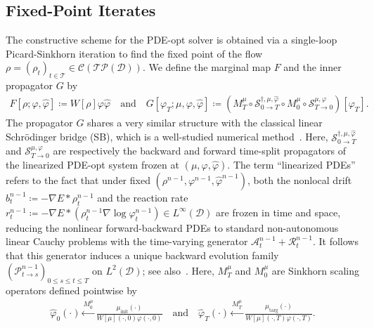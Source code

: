 \documentclass[10pt,a4paper]{article}
\begin{document}
\subsection{Fixed-Point Iterates}
The constructive scheme for the PDE-opt solver is obtained via a single-loop Picard-Sinkhorn iteration to find the fixed point of the flow $\rho = (\rho_t)_{t\in\mathcal{T}} \in \mathcal{C}(\mathcal{T}\mathscr{P}(\mathcal{D}))$. We define the marginal map $F$ and the inner propagator $G$ by
\begin{equation}
\begin{aligned}
F[\rho; \varphi, \hat{\varphi}] \coloneq W[\rho]\varphi\hat{\varphi} \quad \text{and} \quad G[\varphi_T; \mu, \varphi, \hat{\varphi}] \coloneq \left( M_T^{\mu} \circ \mathcal{S}_{0\to T}^{\dagger, \mu, \hat{\varphi}} \circ M_0^{\mu} \circ \mathcal{S}_{T\to 0}^{\mu, \varphi} \right)[\varphi_T].
\end{aligned}
\end{equation}%
The propagator $G$ shares a very similar structure with the classical linear Schrödinger bridge (SB), which is a well-studied numerical method~\cite{Chen2021SinkhornReview, leonard2012from}. Here, $\mathcal{S}_{0\to T}^{\dagger, \mu, \hat{\varphi}}$ and $\mathcal{S}_{T\to 0}^{\mu, \varphi}$ are respectively the backward and forward time-split propagators of the linearized PDE-opt system frozen at $(\mu, \varphi, \hat{\varphi})$. The term ``linearized PDEs'' refers to the fact that under fixed $(\rho^{n-1}, \varphi^{n-1}, \hat{\varphi}^{n-1})$, both the nonlocal drift $b_t^{n-1} \coloneq -\nabla E \ast \rho_t^{n-1}$ and the reaction rate $r_t^{n-1} \coloneq -\nabla E \ast (\rho_t^{n-1} \nabla \log \varphi_t^{n-1}) \in L^\infty(\mathcal{D})$ are frozen in time and space, reducing the nonlinear forward-backward PDEs to standard non-autonomous linear Cauchy problems with the time-varying generator $\mathcal{A}_t^{n-1} + \mathcal{R}_t^{n-1}$. It follows that this generator induces a unique backward evolution family $(\mathcal{P}_{t\to s}^{n-1})_{0 \leqslant s \leqslant t \leqslant T}$ on $L^2(\mathcal{D})$; see also~\cite{BatkaiCsomosFarkasNickel2011}. Here, $M_T^{\mu}$ and $M_0^{\mu}$ are Sinkhorn scaling operators defined pointwise by
\begin{equation}
\begin{aligned}
\hat{\varphi}_0(\cdot) \xleftarrow{M_0^{\mu}} \frac{\mu_{\text{init}}(\cdot)}{W[\mu](\cdot, 0)\varphi(\cdot, 0)} \quad \text{and} \quad \hat{\varphi}_T(\cdot) \xleftarrow{M_T^{\mu}} \frac{\mu_{\text{targ}}(\cdot)}{W[\mu](\cdot, T)\varphi(\cdot, T)}.
\end{aligned}
\end{equation}%
\end{document}

